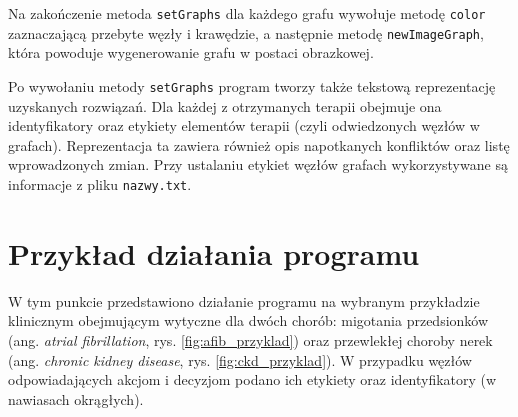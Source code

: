 Na zakończenie metoda \texttt{setGraphs} dla każdego grafu wywołuje metodę \texttt{color} zaznaczającą przebyte węzły i krawędzie, a następnie metodę \texttt{newImageGraph}, która powoduje wygenerowanie grafu w postaci obrazkowej. 

Po wywołaniu metody \texttt{setGraphs} program tworzy także tekstową reprezentację uzyskanych rozwiązań. Dla każdej z otrzymanych terapii obejmuje ona identyfikatory oraz etykiety elementów terapii (czyli odwiedzonych węzłów w grafach). Reprezentacja ta zawiera również opis napotkanych konfliktów oraz listę wprowadzonych zmian. Przy ustalaniu etykiet węzłów grafach wykorzystywane są informacje z pliku \texttt{nazwy.txt}.


\section{Przykład działania programu}
W tym punkcie przedstawiono działanie programu na wybranym przykładzie klinicznym obejmującym wytyczne dla dwóch chorób: migotania przedsionków (ang. \textit{atrial fibrillation}, rys. \ref{fig:afib_przyklad}) oraz przewlekłej choroby nerek (ang. \textit{chronic kidney disease}, rys. \ref{fig:ckd_przyklad}). W przypadku węzłów odpowiadających akcjom i decyzjom podano ich etykiety oraz identyfikatory (w nawiasach okrągłych).

